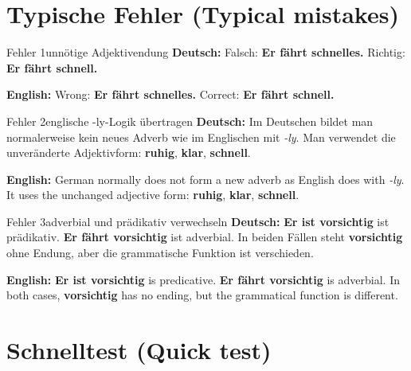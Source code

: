 \documentclass[a4paper,11pt]{article}
\newcommand{\GermanText}[1]{\textbf{Deutsch: }#1\par}
\newcommand{\EnglishText}[1]{{\small\color{SoftGray}\textbf{English: }#1\par}}
\begin{document}
    \section{Typische Fehler \textnormal{(Typical mistakes)}}

        \begin{grammarentry}{Fehler 1}{unnötige Adjektivendung}
            \GermanText{Falsch: \textbf{Er fährt schnelles.} Richtig: \textbf{Er fährt schnell.}}
            \EnglishText{Wrong: \textbf{Er fährt schnelles.} Correct: \textbf{Er fährt schnell.}}
        \end{grammarentry}

        \begin{grammarentry}{Fehler 2}{englische -ly-Logik übertragen}
            \GermanText{Im Deutschen bildet man normalerweise kein neues Adverb wie im Englischen mit \textit{-ly}. Man verwendet die unveränderte Adjektivform: \textbf{ruhig}, \textbf{klar}, \textbf{schnell}.}
            \EnglishText{German normally does not form a new adverb as English does with \textit{-ly}. It uses the unchanged adjective form: \textbf{ruhig}, \textbf{klar}, \textbf{schnell}.}
        \end{grammarentry}

        \begin{grammarentry}{Fehler 3}{adverbial und prädikativ verwechseln}
            \GermanText{\textbf{Er ist vorsichtig} ist prädikativ. \textbf{Er fährt vorsichtig} ist adverbial. In beiden Fällen steht \textbf{vorsichtig} ohne Endung, aber die grammatische Funktion ist verschieden.}
            \EnglishText{\textbf{Er ist vorsichtig} is predicative. \textbf{Er fährt vorsichtig} is adverbial. In both cases, \textbf{vorsichtig} has no ending, but the grammatical function is different.}
        \end{grammarentry}

    \section{Schnelltest \textnormal{(Quick test)}}
\end{document}
